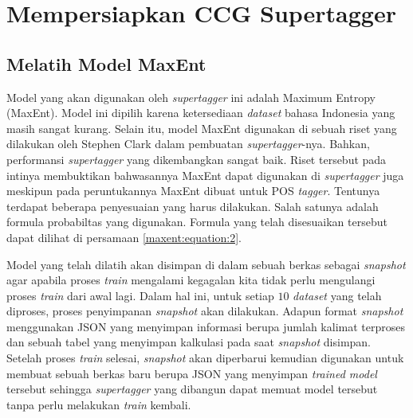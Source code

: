 \section{Mempersiapkan CCG Supertagger}

\subsection{Melatih Model MaxEnt}

Model yang akan digunakan oleh \textit{supertagger} ini adalah Maximum Entropy (MaxEnt).
Model ini dipilih karena ketersediaan \textit{dataset} bahasa Indonesia yang masih sangat kurang.
Selain itu, model MaxEnt digunakan di sebuah riset yang dilakukan oleh Stephen Clark dalam
pembuatan \textit{supertagger}-nya.
Bahkan, performansi \textit{supertagger} yang dikembangkan sangat baik.
Riset tersebut pada intinya membuktikan bahwasannya MaxEnt dapat digunakan di \textit{supertagger}
juga meskipun pada peruntukannya MaxEnt dibuat untuk POS \textit{tagger}.
Tentunya terdapat beberapa penyesuaian yang harus dilakukan.
Salah satunya adalah formula probabiltas yang digunakan.
Formula yang telah disesuaikan tersebut dapat dilihat di persamaan \ref{maxent:equation:2}.

Model yang telah dilatih akan disimpan di dalam sebuah berkas sebagai \textit{snapshot} agar apabila
proses \textit{train} mengalami kegagalan kita tidak perlu mengulangi proses \textit{train} dari
awal lagi.
Dalam hal ini, untuk setiap $10$ \textit{dataset} yang telah diproses, proses penyimpanan
\textit{snapshot} akan dilakukan.
Adapun format \textit{snapshot} menggunakan JSON yang menyimpan informasi berupa jumlah kalimat
terproses dan sebuah tabel yang menyimpan kalkulasi pada saat \textit{snapshot} disimpan.
Setelah proses \textit{train} selesai, \textit{snapshot} akan diperbarui kemudian digunakan
untuk membuat sebuah berkas baru berupa JSON yang menyimpan \textit{trained model} tersebut
sehingga \textit{supertagger} yang dibangun dapat memuat model tersebut tanpa perlu melakukan
\textit{train} kembali.

